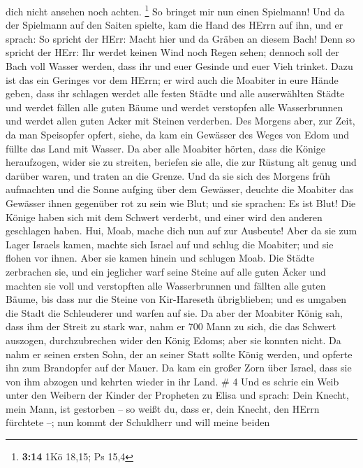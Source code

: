 dich nicht ansehen noch achten. \footnote{\textbf{3:14} 1Kö 18,15; Ps
  15,4}  So bringet mir nun einen Spielmann! Und da der
Spielmann auf den Saiten spielte, kam die Hand des HErrn auf ihn,
 und er sprach: So spricht der HErr: Macht hier und da
Gräben an diesem Bach!  Denn so spricht der HErr: Ihr
werdet keinen Wind noch Regen sehen; dennoch soll der Bach voll Wasser
werden, dass ihr und euer Gesinde und euer Vieh trinket. 
Dazu ist das ein Geringes vor dem HErrn; er wird auch die Moabiter in
eure Hände geben,  dass ihr schlagen werdet alle festen
Städte und alle auserwählten Städte und werdet fällen alle guten Bäume
und werdet verstopfen alle Wasserbrunnen und werdet allen guten Acker
mit Steinen verderben.  Des Morgens aber, zur Zeit, da man
Speisopfer opfert, siehe, da kam ein Gewässer des Weges von Edom und
füllte das Land mit Wasser.  Da aber alle Moabiter hörten,
dass die Könige heraufzogen, wider sie zu streiten, beriefen sie alle,
die zur Rüstung alt genug und darüber waren, und traten an die Grenze.
 Und da sie sich des Morgens früh aufmachten und die Sonne
aufging über dem Gewässer, deuchte die Moabiter das Gewässer ihnen
gegenüber rot zu sein wie Blut;  und sie sprachen: Es ist
Blut! Die Könige haben sich mit dem Schwert verderbt, und einer wird den
anderen geschlagen haben. Hui, Moab, mache dich nun auf zur Ausbeute!
 Aber da sie zum Lager Israels kamen, machte sich Israel
auf und schlug die Moabiter; und sie flohen vor ihnen. Aber sie kamen
hinein und schlugen Moab.  Die Städte zerbrachen sie, und
ein jeglicher warf seine Steine auf alle guten Äcker und machten sie
voll und verstopften alle Wasserbrunnen und fällten alle guten Bäume,
bis dass nur die Steine von Kir-Hareseth übrigblieben; und es umgaben
die Stadt die Schleuderer und warfen auf sie.  Da aber der
Moabiter König sah, dass ihm der Streit zu stark war, nahm er 700 Mann
zu sich, die das Schwert auszogen, durchzubrechen wider den König Edoms;
aber sie konnten nicht.  Da nahm er seinen ersten Sohn, der
an seiner Statt sollte König werden, und opferte ihn zum Brandopfer auf
der Mauer. Da kam ein großer Zorn über Israel, dass sie von ihm abzogen
und kehrten wieder in ihr Land. \# 4  Und es schrie ein Weib
unter den Weibern der Kinder der Propheten zu Elisa und sprach: Dein
Knecht, mein Mann, ist gestorben -- so weißt du, dass er, dein Knecht,
den HErrn fürchtete --; nun kommt der Schuldherr und will meine beiden
